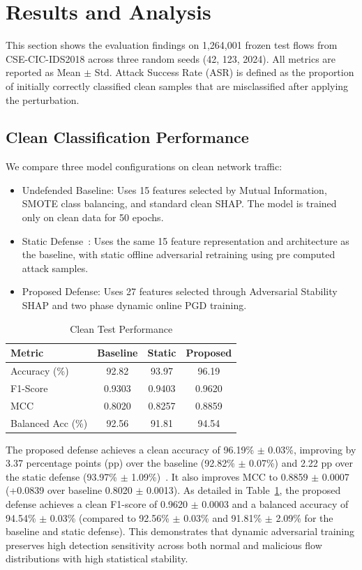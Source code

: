 \documentclass[conference]{IEEEtran}
\begin{document}
\section{Results and Analysis}
This section shows the evaluation findings on 1,264,001 frozen test flows from CSE-CIC-IDS2018 across three random seeds (42, 123, 2024). All metrics are reported as Mean $\pm$ Std. Attack Success Rate (ASR) is defined as the proportion of initially correctly classified clean samples that are misclassified after applying the perturbation.

\subsection{Clean Classification Performance}
We compare three model configurations on clean network traffic:
\begin{itemize}
    \item Undefended Baseline: Uses 15 features selected by Mutual Information, SMOTE class balancing, and standard clean SHAP. The model is trained only on clean data for 50 epochs.
    \item Static Defense~\cite{ref4}: Uses the same 15 feature representation and architecture as the baseline, with static offline adversarial retraining using pre computed attack samples.
    \item Proposed Defense: Uses 27 features selected through Adversarial Stability SHAP and two phase dynamic online PGD training.
\end{itemize}

\begin{table}[!t]
\caption{Clean Test Performance}
\label{tab:clean}
\centering
\begin{tabular}{@{}lccc@{}}
\toprule
\textbf{Metric} & \textbf{Baseline} & \textbf{Static} & \textbf{Proposed} \\
\midrule
Accuracy (\%) & 92.82 & 93.97 & 96.19 \\
F1-Score & 0.9303 & 0.9403 & 0.9620 \\
MCC & 0.8020 & 0.8257 & 0.8859 \\
Balanced Acc (\%) & 92.56 & 91.81 & 94.54 \\
\bottomrule
\end{tabular}
\end{table}

The proposed defense achieves a clean accuracy of 96.19\% $\pm$ 0.03\%, improving by 3.37 percentage points (pp) over the baseline (92.82\% $\pm$ 0.07\%) and 2.22 pp over the static defense (93.97\% $\pm$ 1.09\%)~\cite{ref4}. It also improves MCC to 0.8859 $\pm$ 0.0007 (+0.0839 over baseline 0.8020 $\pm$ 0.0013). As detailed in Table~\ref{tab:clean}, the proposed defense achieves a clean F1-score of 0.9620 $\pm$ 0.0003 and a balanced accuracy of 94.54\% $\pm$ 0.03\% (compared to 92.56\% $\pm$ 0.03\% and 91.81\% $\pm$ 2.09\% for the baseline and static defense). This demonstrates that dynamic adversarial training preserves high detection sensitivity across both normal and malicious flow distributions with high statistical stability.
\end{document}
